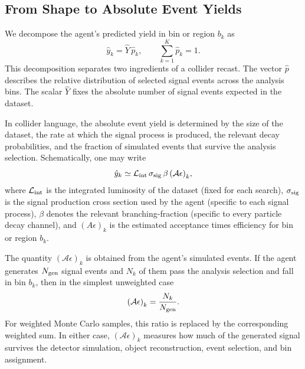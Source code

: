 \documentclass{article}
\begin{document}
\subsection{From Shape to Absolute Event Yields}
\label{app:yield-normalization}

We decompose the agent's predicted yield in bin or region \(b_k\) as
\begin{equation}
    \hat{y}_k = \hat{Y}\,\hat{p}_k,
    \qquad
    \sum_{k=1}^K \hat{p}_k = 1.
\end{equation}
This decomposition separates two ingredients of a collider recast. The vector \(\hat{p}\) describes the relative distribution of selected signal events across the analysis bins. The scalar \(\hat{Y}\) fixes the absolute number of signal events expected in the dataset.

In collider language, the absolute event yield is determined by the size of the dataset, the rate at which the signal process is produced, the relevant decay probabilities, and the fraction of simulated events that survive the analysis selection. Schematically, one may write
\begin{equation}
    \hat{y}_k
    \simeq
    \mathcal{L}_{\rm int}\,
    {\sigma}_{\rm sig}\,
    \beta\,
    {(\mathcal{A}\epsilon)}_k ,
\end{equation}
where \(\mathcal{L}_{\rm int}\) is the integrated luminosity of the dataset (fixed for each search), \({\sigma}_{\rm sig}\) is the signal production cross section used by the agent (specific to each signal process), \(\beta\) denotes the relevant branching-fraction (specific to every particle decay channel), and \({(A\epsilon)}_k\) is the estimated acceptance times efficiency for bin or region \(b_k\).

The quantity \({(\mathcal{A}\epsilon)}_k\) is obtained from the agent's simulated events. If the agent generates \(N_{\rm gen}\) signal events and \(N_k\) of them pass the analysis selection and fall in bin \(b_k\), then in the simplest unweighted case
\begin{equation}
    {(\mathcal{A}\epsilon)}_k = \frac{N_k}{N_{\rm gen}}.
\end{equation}
For weighted Monte Carlo samples, this ratio is replaced by the corresponding weighted sum. In either case, \({(\mathcal{A}\epsilon)}_k\) measures how much of the generated signal survives the detector simulation, object reconstruction, event selection, and bin assignment.
\end{document}
